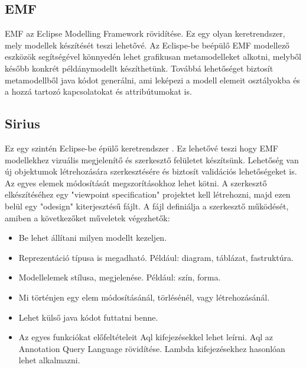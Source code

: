 \subsection{EMF}
\nocite{EMFtut}
EMF az Eclipse Modelling Framework \cite{EMF} rövidítése. Ez egy olyan keretrendszer, mely modellek készítését teszi lehetővé. Az Eclispe-be beépülő EMF modellező eszközök segítségével könnyedén lehet grafikusan metamodelleket alkotni, melyből később konkrét példánymodellt készíthetünk. Továbbá lehetőséget biztosít metamodellből java kódot generálni, ami leképezi a modell elemeit osztályokba és a hozzá tartozó kapcsolatokat és attribútumokat is.

\subsection{Sirius}
\nocite{SiruisTutNagyASz}
\nocite{SiruisTutStart}
\nocite{SiruisTutAdv}
Ez egy szintén Eclipse-be épülő keretrendszer \cite{Sirius}. Ez lehetővé teszi hogy EMF modellekhez vizuális megjelenítő és szerkesztő felületet készítsünk. Lehetőség van új objektumok létrehozására szerkesztésére és biztosít validációs lehetőségeket is. Az egyes elemek módosítását megszorításokhoz lehet kötni. A szerkesztő elkészítéséhez egy "viewpoint specification" projektet kell létrehozni, majd ezen belül egy "odesign" kiterjesztésű fájlt. A fájl definiálja a szerkesztő működését, amiben a következőket műveletek végezhetők:
\begin{itemize}  
	\item Be lehet állítani milyen modellt kezeljen.
	\item Reprezentáció típusa is megadható. Például: diagram, táblázat, fastruktúra.
	\item Modellelemek stílusa, megjelenése. Például: szín, forma.
	\item Mi történjen egy elem módosításánál, törlésénél, vagy létrehozásánál.
	\item Lehet külső java kódot futtatni benne.
	\item Az egyes funkciókat előfeltételeit Aql kifejezésekkel lehet leírni. Aql az Annotation Query Language \cite{Aql} rövidítése. Lambda \cite{Lambda} kifejezésekhez hasonlóan lehet alkalmazni. 
	
\end{itemize}



